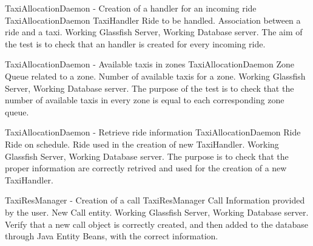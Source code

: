 \testx
{TaxiAllocationDaemon - Creation of a handler for an incoming ride}
{TaxiAllocationDaemon}
{TaxiHandler}
{Ride to be handled.}
{Association between a ride and a taxi.}
{Working Glassfish Server, Working Database server.}
{The aim of the test is to check that an handler is created for every incoming
ride.}

\testx
{TaxiAllocationDaemon - Available taxis in zones}
{TaxiAllocationDaemon}
{Zone}
{Queue related to a zone.}
{Number of available taxis for a zone.}
{Working Glassfish Server, Working Database server.}
{The purpose of the test is to check that the number of available taxis in every
zone is equal to each corresponding zone queue.}

\testx
{TaxiAllocationDaemon - Retrieve ride information}
{TaxiAllocationDaemon}
{Ride}
{Ride on schedule.}
{Ride used in the creation of  new TaxiHandler.}
{Working Glassfish Server, Working Database server.}
{The purpose is to check that the proper information are correctly retrived and
used for the creation of a new TaxiHandler.}

\testx
{TaxiResManager - Creation of a call}
{TaxiResManager}
{Call}
{Information provided by the user.}
{New Call entity.}
{Working Glassfish Server, Working Database server.}
{Verify that a new call object is correctly created, and then added to the database
through Java Entity Beans, with the correct information.}
